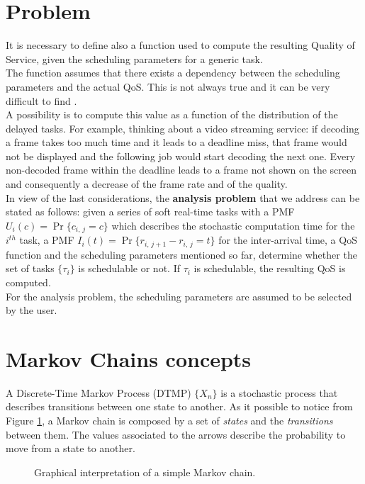 \section{Problem} \label{problem}
It is necessary to define also a function used to compute the resulting Quality of Service, given the scheduling parameters for a generic task.\\
The function assumes that there exists a dependency between the scheduling parameters and the actual QoS. This is not always true and it can be very difficult to find \cite{prosit}.\\
A possibility is to compute this value as a function of the distribution of the delayed tasks. For example, thinking about a video streaming service: if decoding a frame takes too much time and it leads to a deadline miss, that frame would not be displayed and the following job would start decoding the next one. Every non-decoded frame within the deadline leads to a frame not shown on the screen and consequently a decrease of the frame rate and of the quality.\\
In view of the last considerations, the \textbf{analysis problem} that we address can be stated as follows: given a series of soft real-time tasks with a PMF \( U_{i}(c) = \Pr\{c_{i,\,j} = c\} \) which describes the stochastic computation time for the \( i^{th} \) task, a PMF \( I_{i}(t) = \Pr\{r_{i,\,j+1}-r_{i,\,j} = t\} \) for the inter-arrival time, a QoS function and the scheduling parameters mentioned so far, determine whether the set of tasks \( \{\tau_{i}\} \) is schedulable or not. If \( \tau_{i} \) is schedulable, the resulting QoS is computed.\\
For the analysis problem, the scheduling parameters are assumed to be selected by the user.

\section{Markov Chains concepts} \label{mcconcepts}
A Discrete-Time Markov Process (DTMP) \( \{X_{n}\} \) is a stochastic process that describes transitions between one state to another. As it possible to notice from Figure \ref{automaton}, a Markov chain is composed by a set of \emph{states} and the \emph{transitions} between them. The values associated to the arrows describe the probability to move from a state to another.
\begin{figure}[H]
  \caption{Graphical interpretation of a simple Markov chain.}
  \label{automaton}
\end{figure}

